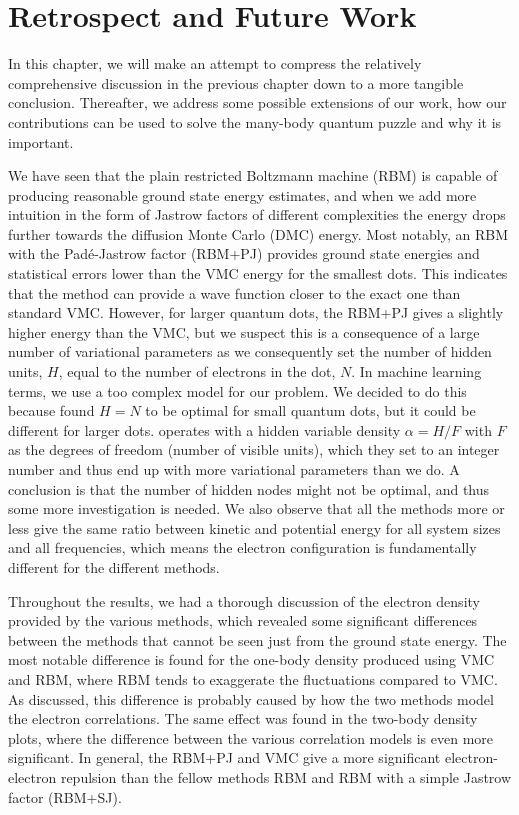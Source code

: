 \chapter{Retrospect and Future Work} \label{sec:conclusion}
In this chapter, we will make an attempt to compress the relatively comprehensive discussion in the previous chapter down to a more tangible conclusion. Thereafter, we address some possible extensions of our work, how our contributions can be used to solve the many-body quantum puzzle and why it is important. 

We have seen that the plain restricted Boltzmann machine (RBM) is capable of producing reasonable ground state energy estimates, and when we add more intuition in the form of Jastrow factors of different complexities the energy drops further towards the diffusion Monte Carlo (DMC) energy. Most notably, an RBM with the Padé-Jastrow  factor (RBM+PJ) provides ground state energies and statistical errors lower than the VMC energy for the smallest dots. This indicates that the method can provide a wave function closer to the exact one than standard VMC. However, for larger quantum dots, the RBM+PJ gives a slightly higher energy than the VMC, but we suspect this is a consequence of a large number of variational parameters as we consequently set the number of hidden units, $H$, equal to the number of electrons in the dot, $N$. In machine learning terms, we use a too complex model for our problem. We decided to do this because \citet{nordhagen_computational_2018} found $H=N$ to be optimal for small quantum dots, but it could be different for larger dots. \citet{carleo_solving_2017} operates with a hidden variable density $\alpha=H/F$ with $F$ as the degrees of freedom (number of visible units), which they set to an integer number and thus end up with more variational parameters than we do. A conclusion is that the number of hidden nodes might not be optimal, and thus some more investigation is needed. We also observe that all the methods more or less give the same ratio between kinetic and potential energy for all system sizes and all frequencies, which means the electron configuration is fundamentally different for the different methods.

Throughout the results, we had a thorough discussion of the electron density provided by the various methods, which revealed some significant differences between the methods that cannot be seen just from the ground state energy. The most notable difference is found for the one-body density produced using VMC and RBM, where RBM tends to exaggerate the fluctuations compared to VMC. As discussed, this difference is probably caused by how the two methods model the electron correlations. The same effect was found in the two-body density plots, where the difference between the various correlation models is even more significant. In general, the RBM+PJ and VMC give a more significant electron-electron repulsion than the fellow methods RBM and RBM with a simple Jastrow factor (RBM+SJ).

